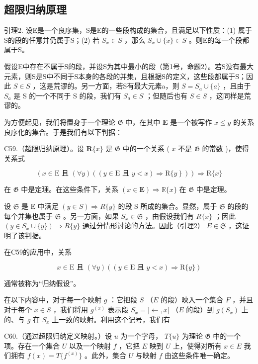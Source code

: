 \subsection{超限归纳原理}

引理2. 设E是一个良序集，S是E的一些段构成的集合，且满足以下性质：(1) 属于S的段的任意并仍属于S；(2) 若 \(S_{x} \in S\) ，那么 \(S_{x} \cup \{x\} \in S\) 。则E的每一个段都属于S。

假设E中存在不属于S的段，并设S为其中最小的段（第1号，命题2）。若S没有最大元素，则S是S中不同于S本身的各段的并集，且根据S的定义，这些段都属于S；因此 \(S \in S\) ，这是荒谬的。另一方面，若S有最大元素a，则 \(S = S_{a} \cup \{a\}\) ，且由于 \(S_{a}\) 是 S 的一个不同于 S 的段，我们有 \(S_{a} \in S\) ；但随后也有 \(S \in S\) ，这同样是荒谬的。

为方便起见，我们将置身于一个理论 \(\mathfrak{G}\) 中，在其中 \(\mathbf{E}\) 是一个被写作 \(x \leqslant y\) 的关系良序化的集合。于是我们有以下判据：

C59.（超限归纳原理）。设 \(\mathbf{R}\{x\}\) 是 \(\mathfrak{G}\) 中的一个关系 ( \(x\) 不是 \(\mathfrak{G}\) 的常数 )，使得关系式

\[
(x \in \mathrm{E} \text { 且 } (\forall y) ((y \in \mathrm{E} \text { 且 } y <   x) \Longrightarrow \mathrm{R} \{\left. y \right\})) \Longrightarrow \mathrm{R} \{x \}
\]

在 \(\mathfrak{G}\) 中是定理。在这些条件下，关系 \((x\in \mathbf{E})\Rightarrow \mathbb{R}\{x\}\) 在 \(\mathfrak{G}\) 中是定理。

设 \(\mathfrak{S}\) 是 E 中满足 \((y\in S)\Longrightarrow R\{y\}\) 的段 S 所成的集合。显然，属于 \(\mathfrak{S}\) 的段的每个并集也属于 \(\mathfrak{S}\) 。另一方面，如果 \(S_x\in \mathfrak{S}\) ，由假设我们有 \(R\{x\}\) ；因此 \((y\in S_x\cup \{y\})\Longrightarrow R\{y\}\) 通过分情形讨论的方法。因此（引理2） \(E\in \mathfrak{S}\) ，这证明了该判据。

在C59的应用中，关系

\[
x \in \mathrm{E} \text {   且   } (\forall y) ((y \in \mathrm{E} \text {   且   } y <   x) \Longrightarrow \mathrm{R} \{y \})
\]

通常被称为“归纳假设”。

在以下内容中，对于每一个映射 \(g\) ：它把段 \(S\) （\(E\) 的段）映入一个集合 \(F\) ，并且对于每个 \(x \in S\) ，我们将用 \(g^{(x)}\) 表示段 \(S_x = ] \leftarrow, x[\) （\(E\) 的段）到 \(g(S_x)\) 上的、与 \(g\) 在 \(S_x\) 上一致的映射。利用这个记号，我们有

C60.（通过超限归纳定义映射。）设 \(u\) 为一个字母， \(T\{u\}\) 为理论 \(\mathfrak{G}\) 中的一个项。存在一个集合 \(U\) 以及一个映射 \(f\) ，它把 \(E\) 映到 \(U\) 上，使得对所有 \(x \in E\) 我们拥有 \(f(x) = T\{f^{(x)}\}\) 。此外，集合 \(U\) 与映射 \(f\) 由这些条件唯一确定。

